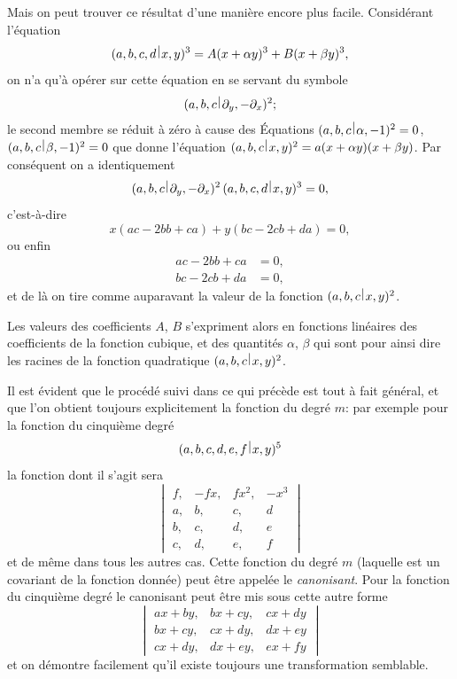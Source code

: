 \documentclass[11pt,a4paper]{book}
\theoremstyle{plain}
\newcommand{\wrule}{\hspace{-0.1em}\mid\hspace{-0.1em}}
\begin{document}
Mais on peut trouver ce r\'{e}sultat d'une mani\`{e}re encore plus facile. Consid\'{e}rant l'\'{e}quation
\[
(a,b,c,d\,\raisebox{0.5ex}{$\wrule$}\,x,y)^3=A(x+\alpha y)^3+B(x+\beta y)^3,
\]
on n'a qu'\`{a} op\'{e}rer sur cette \'{e}quation en se servant du symbole
\[
(a,b,c\,\raisebox{0.5ex}{$\wrule$}\,\partial_y,-\partial_x)^2;
\]
le second membre se r\'{e}duit \`{a} z\'{e}ro \`{a} cause des \'{E}quations $(a,b,c\,\raisebox{0.5ex}{$\wrule$}\,\alpha,-1)^2=0$, $(a,b,c\,\raisebox{0.5ex}{$\wrule$}\,\beta,-1)^2=0$ que donne l'\'{e}quation $(a,b,c\,\raisebox{0.5ex}{$\wrule$}\,x,y)^2=a(x+\alpha y)(x+\beta y)$. Par cons\'{e}quent on a identiquement
\[
(a,b,c\,\raisebox{0.5ex}{$\wrule$}\,\partial_y,-\partial_x)^2\,(a,b,c,d\,\raisebox{0.5ex}{$\wrule$}\,x,y)^3=0,
\]
c'est-\`{a}-dire
\[
x(ac-2bb+ca)+y(bc-2cb+da)=0,
\]
ou enfin
\begin{align*}
ac-2bb+ca&=0,\\
bc-2cb+da&=0,
\end{align*}
et de l\`{a} on tire comme auparavant la valeur de la fonction $(a,b,c\,\raisebox{0.5ex}{$\wrule$}\,x,y)^2$.

Les valeurs des coefficients $A$, $B$ s'expriment alors en fonctions lin\'{e}aires des coefficients de la fonction cubique, et des quantit\'{e}s $\alpha$, $\beta$ qui sont pour ainsi dire les racines de la fonction quadratique $(a,b,c\,\raisebox{0.5ex}{$\wrule$}\,x,y)^2$.

Il est \'{e}vident que le proc\'{e}d\'{e} suivi dans ce qui pr\'{e}c\`{e}de est tout \`{a} fait g\'{e}n\'{e}ral, et que l'on obtient toujours explicitement la fonction du degr\'{e} $m$: par exemple pour la fonction du cinqui\`{e}me degr\'{e}
\[
(a,b,c,d,e,f\,\raisebox{0.5ex}{$\wrule$}\,x,y)^5
\]
la fonction dont il s'agit sera
\[
\begin{vmatrix}
f, & -fx, & fx^2, & -x^3\\
a, & b, & c, & d\\
b, & c, & d, & e\\
c, & d, & e, & f
\end{vmatrix}
\]
et de m\^{e}me dans tous les autres cas. Cette fonction du degr\'{e} $m$ (laquelle est un covariant de la fonction donn\'{e}e) peut \^{e}tre appel\'{e}e le \textit{canonisant}. Pour la fonction du cinqui\`{e}me degr\'{e} le canonisant peut \^{e}tre mis sous cette autre forme
\[
\begin{vmatrix}
ax+by, & bx+cy, & cx+dy\\
bx+cy, & cx+dy, & dx+ey\\
cx+dy, & dx+ey, & ex+fy
\end{vmatrix}
\]
et on d\'{e}montre facilement qu'il existe toujours une transformation semblable.
\end{document}
